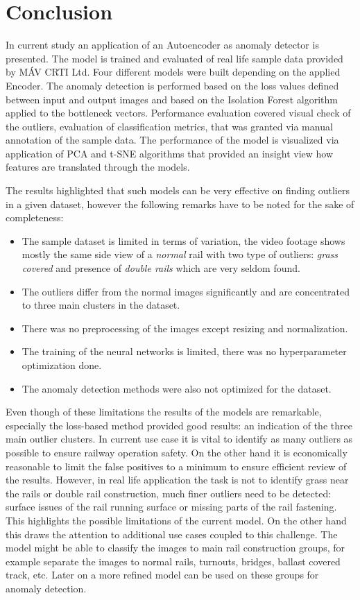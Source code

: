 \section{Conclusion} \label{conclusion}
In current study an application of an Autoencoder as anomaly detector is presented.
The model is trained and evaluated of real life sample data provided by MÁV CRTI Ltd.
Four different models were built depending on the applied Encoder.
The anomaly detection is performed based on the loss values defined between input
and output images and based on the Isolation Forest algorithm applied to the bottleneck
vectors.
Performance evaluation covered visual check of the outliers, evaluation of classification
metrics, that was granted via manual annotation of the sample data.
The performance of the model is visualized via application of PCA and t-SNE algorithms that
provided an insight view how features are translated through the models.

The results highlighted that such models can be very effective on finding outliers
in a given dataset, however the following remarks have to be noted for the sake of completeness:

\begin{itemize}
    \item The sample dataset is limited in terms of variation, the video footage shows
          mostly the same side view of a \emph{normal} rail with two type of outliers:
          \emph{grass covered} and presence of \emph{double rails} which are very seldom found.
    \item The outliers differ from the normal images significantly and are concentrated to
          three main clusters in the dataset.
    \item There was no preprocessing of the images except resizing and normalization.
    \item The training of the neural networks is limited, there was no hyperparameter
          optimization done.
    \item The anomaly detection methods were also not optimized for the dataset.
\end{itemize}

Even though of these limitations the results of the models are remarkable, especially the
loss-based method provided good results: an indication of the three main outlier clusters.
In current use case it is vital to identify as many outliers as possible to ensure railway
operation safety.
On the other hand it is economically reasonable to limit the false positives to a minimum
to ensure efficient review of the results.
However, in real life application the task is not to identify grass near the rails or double rail
construction, much finer outliers need to be detected: surface issues of the rail running surface
or missing parts of the rail fastening.
This highlights the possible limitations of the current model.
On the other hand this draws the attention to additional use cases coupled to this challenge.
The model might be able to classify the images to main rail construction groups, for example
separate the images to normal rails, turnouts, bridges, ballast covered track, etc.
Later on a more refined model can be used on these groups for anomaly detection.

